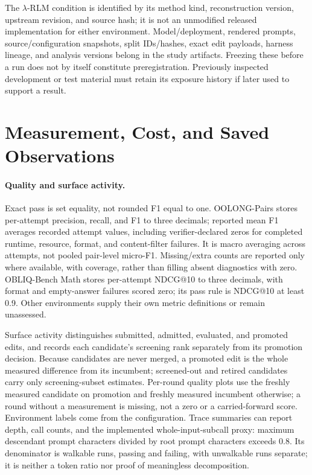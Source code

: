 The $\lambda$-RLM condition is identified by its method kind, reconstruction
version, upstream revision, and source hash; it is not an unmodified released
implementation for either environment. Model/deployment, rendered prompts,
source/configuration snapshots, split IDs/hashes, exact edit payloads, harness
lineage, and analysis versions belong in the study artifacts. Freezing these
before a run does not by itself constitute preregistration. Previously inspected
development or test material must retain its exposure history if later used to
support a result.

\section{Measurement, Cost, and Saved Observations}
\label{app:measurement}
\label{sec:cost}

\paragraph{Quality and surface activity.}
Exact pass is set equality, not rounded F1 equal to one. OOLONG-Pairs stores
per-attempt precision, recall, and F1 to three decimals; reported mean F1 averages
recorded attempt values, including verifier-declared zeros for completed runtime,
resource, format, and content-filter failures. It is macro averaging across
attempts, not pooled pair-level micro-F1. Missing/extra counts are reported only
where available, with coverage, rather than filling absent diagnostics with zero.
OBLIQ-Bench Math stores per-attempt NDCG@10 to three decimals, with format and
empty-answer failures scored zero; its pass rule is NDCG@10 at least 0.9.
Other environments supply their own metric definitions or remain unassessed.

Surface activity distinguishes submitted, admitted, evaluated, and promoted
edits, and records each candidate's screening rank separately from its
promotion decision. Because candidates are never merged, a promoted edit is the
whole measured difference from its incumbent; screened-out and retired
candidates carry only screening-subset estimates. Per-round quality plots use the freshly measured
candidate on promotion and freshly measured incumbent otherwise; a round without
a measurement is missing, not a zero or a carried-forward score. Environment
labels come from the configuration. Trace summaries can report depth, call
counts, and the implemented whole-input-subcall proxy: maximum descendant prompt
characters divided by root prompt characters exceeds 0.8. Its denominator is
walkable runs, passing and failing, with unwalkable runs separate; it is neither
a token ratio nor proof of meaningless decomposition.

